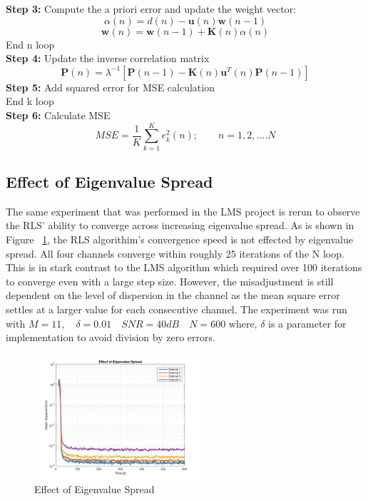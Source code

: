 \documentclass[journal]{IEEEtran}
\begin{document}
\indent \textbf{Step 3:} Compute the a priori error and update the weight vector:
\begin{equation}
  \alpha(n) = d(n) - \boldsymbol{u}(n)\boldsymbol{w}(n-1)
\end{equation}
\begin{equation}
  \boldsymbol{w}(n)= \boldsymbol{w}(n-1)+\boldsymbol{K}(n)\alpha(n)
\end{equation}
End n loop\\
\indent \textbf{Step 4:} Update the inverse correlation matrix
\begin{equation}
  \boldsymbol{P}(n)= \lambda^{-1}[\boldsymbol{P}(n-1)-\boldsymbol{K}(n)\boldsymbol{u}^T(n)\boldsymbol{P}(n-1)]
\end{equation}
\textbf{Step 5:} Add squared error for MSE calculation\\
End k loop\\
\textbf{Step 6:} Calculate MSE
\begin{equation}
  \label{eq:MSE}
  MSE=\dfrac{1}{K}\sum_{k=1}^{K}e_k^2(n); \qquad n = 1,2,....N
\end{equation}
\subsection{Effect of Eigenvalue Spread}
The same experiment that was performed in the LMS project is rerun to observe the RLS' ability to
converge across increasing eigenvalue spread. As is shown in Figure ~\ref{fig:eigenspread2},
the RLS algorithim's convergence speed is not effected by eigenvalue spread. All four channels converge
within roughly 25 iterations of the N loop. This is in stark contrast to the LMS algorithm which
required over 100 iterations to converge even with a large step size. However, the misadjustment is still dependent on
the level of dispersion in the channel as the mean square error settles at a larger value for each consecutive channel. The experiment was run
with $M = 11, \quad \delta = 0.01 \quad SNR = 40dB \quad N = 600$ where, $\delta$ is a parameter for implementation
to avoid division by zero errors.
\begin{figure}[H]
  \centering
  \captionsetup{justification=centering,font = small}
  \includegraphics[width=0.55\textwidth, inner] {Plots/Project2_eigenspread.jpg}
  \caption{Effect of Eigenvalue Spread}
    \label{fig:eigenspread2}
\end{figure}
\end{document}

